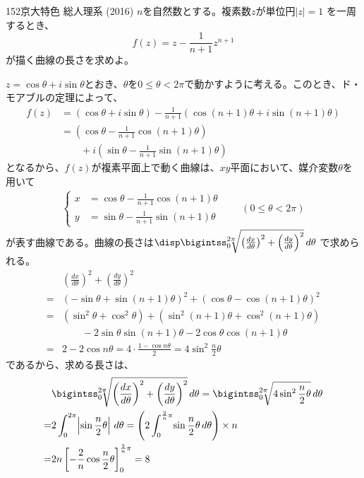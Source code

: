 \begin{prob}{152}{\maru}{京大特色 総人理系 (2016)}
 $n$を自然数とする。複素数$z$が単位円$|z|=1$ を一周するとき、
 \[ f(z) = z - \frac{1}{n+1}z^{n+1} \]
 が描く曲線の長さを求めよ。
\end{prob}
$z=\cos\theta+i\sin\theta$とおき、$\theta$を$0\le\theta <2\pi$で動かすように考える。このとき、ド・モアブルの定理によって、
\begin{align*}
 f(z)&=(\cos\theta+i\sin\theta)-\frac{1}{n+1}\left(\cos(n+1)\theta+i\sin(n+1)\theta\right) \\
 &=\left(\cos\theta-\frac{1}{n+1}\cos(n+1)\theta\right) \\
 &\qquad +i\left(\sin\theta-\frac{1}{n+1}\sin(n+1)\theta\right)
\end{align*}
となるから、$f(z)$が複素平面上で動く曲線は、$xy$平面において、媒介変数$\theta$を用いて
\begin{align*}
 \left\{
 \begin{aligned}
  x&=\cos\theta-\frac{1}{n+1}\cos(n+1)\theta \\
  y&=\sin\theta-\frac{1}{n+1}\sin(n+1)\theta
 \end{aligned}
 \right. \qquad (0\le \theta < 2\pi)
\end{align*}
が表す曲線である。曲線の長さは$\disp \bigintss_0^{2\pi}\!\!\! \sqrt{\left(\frac{dx}{d\theta}\right)^2+\left(\frac{dy}{d\theta}\right)^2} \,d\theta$ で求められる。
\begin{align*}
 &\left(\frac{dx}{d\theta}\right)^2+\left(\frac{dy}{d\theta}\right)^2 \\
=&(-\sin\theta+\sin(n+1)\theta)^2+(\cos\theta-\cos(n+1)\theta)^2 \\
 =& (\sin^2\theta+\cos^2\theta)+(\sin^2(n+1)\theta+\cos^2(n+1)\theta) \\
 & \qquad -2\sin\theta\sin(n+1)\theta-2\cos\theta\cos(n+1)\theta \\
 =& 2-2\cos n\theta =4\cdot\frac{1-\cos n\theta}{2} = 4\sin^2\frac{n}{2}\theta
\end{align*}
であるから、求める長さは、
\begin{align*}
 &\bigintss_0^{2\pi}\!\!\!\sqrt{\left(\frac{dx}{d\theta}\right)^2+\left(\frac{dy}{d\theta}\right)^2} \,d\theta=\bigintss_0^{2\pi}\!\!\!\sqrt{4\sin^2\frac{n}{2}\theta} \,d\theta \\
 =&2\int_0^{2\pi}\!\left|\sin\frac{n}{2}\theta\right| \,d\theta = \left(2\int_0^{\frac{2}{n}\pi}\! \sin\frac{n}{2}\theta \,d\theta \right) \times n \\
 =& 2n\left[-\frac{2}{n}\cos\frac{n}{2}\theta\right]^{\frac{2}{n}\pi}_0=8
\end{align*}